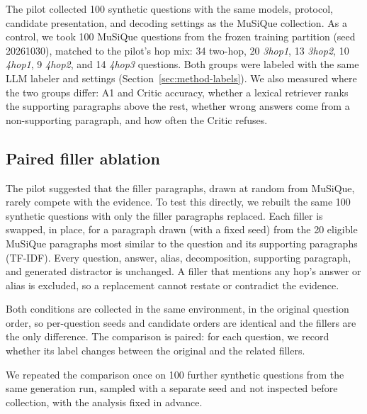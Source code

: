 The pilot collected 100 synthetic questions with the same models, protocol,
candidate presentation, and decoding settings as the MuSiQue collection. As
a control, we took 100 MuSiQue questions from the frozen training partition
(seed 20261030), matched to the pilot's hop mix: 34 two-hop, 20 \textit{3hop1},
13 \textit{3hop2}, 10 \textit{4hop1}, 9 \textit{4hop2}, and 14 \textit{4hop3}
questions. Both groups were labeled with the same LLM labeler and settings
(Section~\ref{sec:method-labels}). We also measured where the two groups
differ: A1 and Critic accuracy, whether a lexical retriever ranks the
supporting paragraphs above the rest, whether wrong answers come from a
non-supporting paragraph, and how often the Critic refuses.

\subsection{Paired filler ablation}
\label{sec:exp-fillers}

The pilot suggested that the filler paragraphs, drawn at random from
MuSiQue, rarely compete with the evidence. To test this directly, we rebuilt
the same 100 synthetic questions with only the filler paragraphs replaced.
Each filler is swapped, in place, for a paragraph drawn (with a fixed seed)
from the 20 eligible MuSiQue paragraphs most similar to the question and its
supporting paragraphs (TF-IDF). Every
question, answer, alias, decomposition, supporting paragraph, and generated
distractor is unchanged. A filler that mentions any hop's answer or alias is
excluded, so a replacement cannot restate or contradict the evidence.

Both conditions are collected in the same environment, in the original
question order, so per-question seeds and candidate orders are identical
and the fillers are the only difference. The comparison is paired: for each
question, we record whether its label changes between the original and the
related fillers.

We repeated the comparison once on 100 further synthetic questions from the
same generation run, sampled with a separate seed and not inspected before
collection, with the analysis fixed in advance.
